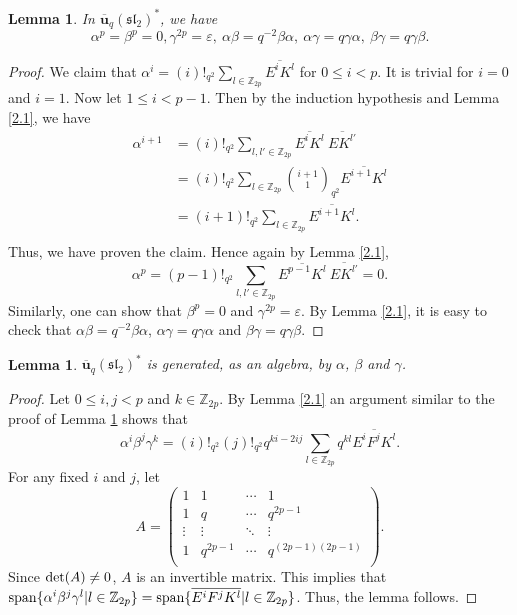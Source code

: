 \documentclass[10pt,oneside]{amsart}
\newtheorem{lemma}[proposition]{Lemma}
\theoremstyle{definition}
\def\<{\leqslant}
\def\a{\alpha}
\def\b{\beta}
\def\g{\gamma}
\begin{document}
\begin{lemma}\label{2.2}
In $\mathbf{\overline{u}}_q(\mathfrak{sl_2})^*$, we have
$$\a^{p}=\b^p=0, \g^{2p}=\varepsilon,\ \a\b=q^{-2}\b\a,\ \a\g=q\g\a,\ \b\g=q\g\b.$$
\end{lemma}
\begin{proof}
We claim that $\a^i=(i)!_{q^2}\sum_{l\in \mathbb{Z}_{2p}}\overline{E^iK^l}$ for $0\<i<p$. It is trivial for $i=0$ and $i=1$. Now let $1\<i<p-1$. Then by the induction hypothesis and Lemma \ref{2.1}, we have
$$\begin{array}{rl}
\a^{i+1}&=(i)!_{q^2}\sum_{l,l'\in \mathbb{Z}_{2p}}\overline{E^iK^l} \ \overline{EK^{l'}}\\
&=(i)!_{q^2}\sum_{l\in \mathbb{Z}_{2p}}\binom{i+1}{1}_{q^2}\overline{E^{i+1}K^l}\\
&=(i+1)!_{q^2}\sum_{l\in \mathbb{Z}_{2p}}\overline{E^{i+1}K^l}.\\
\end{array}$$
Thus, we have proven the claim. Hence again by Lemma \ref{2.1},
$$\a^p=(p-1)!_{q^2}\sum_{l,l'\in \mathbb{Z}_{2p}}\overline{E^{p-1}K^l} \ \overline{EK^{l'}}=0.$$
Similarly, one can show that $\b^p=0$ and $\g^{2p}=\varepsilon.$ By Lemma \ref{2.1}, it is easy to check that $\a\b=q^{-2}\b\a$, $\a\g=q\g\a$ and $\b\g=q\g\b$.
\end{proof}

\begin{lemma}\label{2.3}
$\mathbf{\overline{u}}_q(\mathfrak{sl_2})^*$ is generated, as an algebra, by $\a$, $\b$ and $\g$.
\end{lemma}
\begin{proof} Let $0\<i,j<p$ and $k\in \mathbb{Z}_{2p}.$
By Lemma \ref{2.1} an argument similar to the proof of Lemma \ref{2.2} shows that
$$\a^i\b^j\g^k=(i)!_{q^2}(j)!_{q^2}q^{ki-2ij}\sum_{l\in\mathbb{Z}_{2p}}q^{kl}\overline{E^iF^jK^l}.$$
For any fixed $i$ and $j$, let $$A=\left(
       \begin{array}{cccc}
         1 & 1 & \cdots & 1 \\
         1 & q & \cdots & q^{2p-1} \\
         \vdots & \vdots & \ddots & \vdots \\
         1 & q^{2p-1} & \cdots & q^{(2p-1)(2p-1)} \\
       \end{array}
     \right)
.$$ Since ${\rm det}(A)\neq 0$, $A$ is an invertible matrix. This implies that  ${\rm span}\{\a^i\b^j\g^l|l\in \mathbb{Z}_{2p}\}={\rm span}\{\overline{E^iF^jK^l}|l\in \mathbb{Z}_{2p}\}$. Thus, the lemma follows.
\end{proof}
\end{document}
